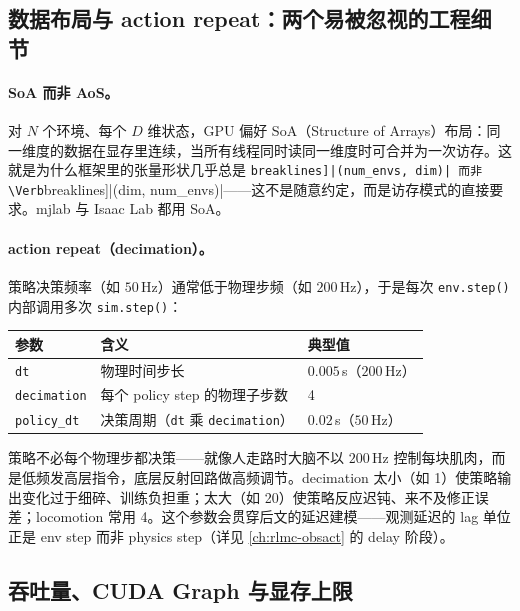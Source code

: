 \subsection{数据布局与 action repeat：两个易被忽视的工程细节}

\paragraph{SoA 而非 AoS。}对 $N$ 个环境、每个 $D$ 维状态，GPU 偏好 SoA（Structure of Arrays）布局：同一维度的数据在显存里连续，当所有线程同时读同一维度时可合并为一次访存。这就是为什么框架里的张量形状几乎总是 \Verb[breaklines]|(num_envs, dim)| 而非 \Verb[breaklines]|(dim, num_envs)|——这不是随意约定，而是访存模式的直接要求。mjlab 与 Isaac Lab 都用 SoA。

\paragraph{action repeat（decimation）。}策略决策频率（如 $50\,$Hz）通常低于物理步频（如 $200\,$Hz），于是每次 \verb|env.step()| 内部调用多次 \verb|sim.step()|：

\begin{center}
\small
\begin{tabular}{@{}lll@{}}
\toprule
参数 & 含义 & 典型值 \\
\midrule
\verb|dt| & 物理时间步长 & $0.005\,$s（$200\,$Hz） \\
\verb|decimation| & 每个 policy step 的物理子步数 & 4 \\
\verb|policy_dt| & 决策周期（\verb|dt| 乘 \verb|decimation|） & $0.02\,$s（$50\,$Hz） \\
\bottomrule
\end{tabular}
\end{center}

\begin{insight}\label{ins:rlmc-eco-decimation}
策略不必每个物理步都决策——就像人走路时大脑不以 $200\,$Hz 控制每块肌肉，而是低频发高层指令，底层反射回路做高频调节。decimation 太小（如 1）使策略输出变化过于细碎、训练负担重；太大（如 20）使策略反应迟钝、来不及修正误差；locomotion 常用 4。这个参数会贯穿后文的延迟建模——观测延迟的 lag 单位正是 env step 而非 physics step（详见 \cref{ch:rlmc-obsact} 的 delay 阶段）。
\end{insight}

\subsection{吞吐量、CUDA Graph 与显存上限}

